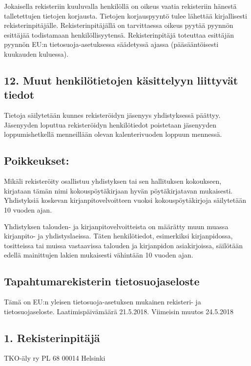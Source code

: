 \documentclass[finnish]{tktltiki}
\begin{document}
Jokaisella rekisteriin kuuluvalla henkilöllä on oikeus vaatia rekisteriin hänestä talletettujen tietojen korjausta. Tietojen korjauspyyntö tulee lähettää kirjallisesti rekisterinpitäjälle. Rekisterinpitäjällä on tarvittaessa oikeus pyytää pyynnön esittäjää todistamaan henkilöllisyytensä. Rekisterinpitäjä toteuttaa esittäjän pyynnön EU:n tietosuoja-asetuksessa säädetyssä ajassa (pääsääntöisesti kuukauden kuluessa).

\subsection*{12. Muut henkilötietojen käsittelyyn liittyvät tiedot}

Tietoja säilytetään kunnes rekisteröidyn jäsenyys yhdistyksessä päättyy. Jäsenyyden loputtua rekisteröidyn henkilötiedot poistetaan jäsenyyden loppumishetkellä menneillään olevan kalenterivuoden loppuun mennessä.

\subsection*{Poikkeukset:}

Mikäli rekisteröity osallistuu yhdistyksen tai sen hallituksen kokoukseen, kirjataan tämän nimi kokouspöytäkirjaan hyvän pöytäkirjatavan mukaisesti. Yhdistyksiä koskevan kirjanpitovelvoitteen vuoksi kokouspöytäkirjoja säilytetään 10 vuoden ajan.

Yhdistyksen talouden- ja kirjanpitovelvoitteista on määrätty muun muassa kirjanpito- ja yhdistyslaeissa. Täten henkilötiedot, esimerkiksi kirjanpidossa, tositteissa tai muissa vastaavissa talouden ja kirjanpidon asiakirjoissa, säilötään edellä mainittujen lakien mukaisesti vähintään 10 vuoden ajan.



\pagestyle{empty}


\subsection*{Tapahtumarekisterin tietosuojaseloste}
Tämä on EU:n yleisen tietosuoja-asetuksen mukainen rekisteri- ja tietosuojaseloste.
Laatimispäivämäärä 21.5.2018. Viimeisin muutos 24.5.2018

\subsection*{1. Rekisterinpitäjä}
TKO-äly ry
PL 68
00014 Helsinki
\end{document}
